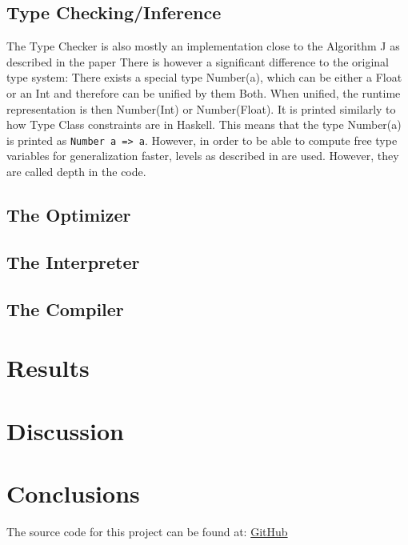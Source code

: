 \documentclass[12pt]{article}
\begin{document}
\subsection{Type Checking/Inference}
The Type Checker is also mostly an implementation close to the Algorithm J as described
in the paper \cite{damasPrincipalTypeschemesFunctional1982}
There is however a significant difference to the original type system:
There exists a special type Number(a), which can be either a Float or an Int
and therefore can be unified by them Both. When unified, the runtime representation
is then Number(Int) or Number(Float).
It is printed similarly to how Type Class constraints are in Haskell.
This means that the type Number(a) is printed as \texttt{Number a => a}.
However, in order to be able to compute free type variables for generalization
faster, levels as described in \cite{EfficientInsightfulGeneralization} are
used. However, they are called depth in the code.

\subsection{The Optimizer}

\subsection{The Interpreter}

\subsection{The Compiler}

\section{Results}

\section{Discussion}

\section{Conclusions}

\newpage



\listoflistings

The source code for this project can be found at: \href{https://github.com/enmiligi/matura-project}{GitHub}
\end{document}
